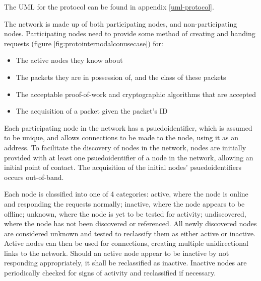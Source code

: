 The UML for the protocol can be found in appendix \ref{uml-protocol}.

The network is made up of both participating nodes, and non-participating nodes. Participating nodes need to provide some method of creating and handing requests (figure \ref{fig:protointernodalconusecase}) for: 
\begin{itemize}[topsep=-5pt,itemsep=-1ex,partopsep=2ex,parsep=1.5ex]
	\item The active nodes they know about
	\item The packets they are in possession of, and the class of these packets
	\item The acceptable proof-of-work and cryptographic algorithms that are accepted
	\item The acquisition of a packet given the packet's ID
\end{itemize} \vspace{0.7ex}

Each participating node in the network has a psuedoidentifier, which is assumed to be unique, and allows connections to be made to the node, using it as an address. To facilitate the discovery of nodes in the network, nodes are initially provided with at least one psuedoidentifier of a node in the network, allowing an initial point of contact. The acquisition of the initial nodes' psuedoidentifiers occurs out-of-band.

Each node is classified into one of 4 categories: active, where the node is online and responding the requests normally; inactive, where the node appears to be offline; unknown, where the node is yet to be tested for activity; undiscovered, where the node has not been discovered or referenced. All newly discovered nodes are considered unknown and tested to reclassify them as either active or inactive. Active nodes can then be used for connections, creating multiple unidirectional links to the network. Should an active node appear to be inactive by not responding appropriately, it shall be reclassified as inactive. Inactive nodes are periodically checked for signs of activity and reclassified if necessary. %


